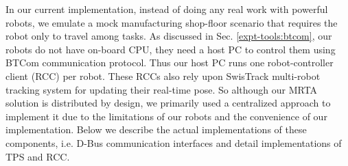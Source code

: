 In our current implementation, instead of doing any real work with powerful robots, we emulate a mock manufacturing shop-floor scenario that requires the robot only to travel among tasks. As discussed in Sec. \ref{expt-tools:btcom}, our robots do not have on-board CPU, they need a host PC to  control them using BTCom communication protocol. Thus our host PC  runs one robot-controller client (RCC) per robot. These RCCs also rely upon SwisTrack multi-robot tracking system for updating their real-time pose. So although our MRTA solution is distributed by design, we primarily used a centralized approach to implement it due to the limitations of our robots and the convenience of our implementation. Below we describe the actual implementations of these components, i.e. D-Bus communication interfaces and detail implementations of TPS and RCC.
